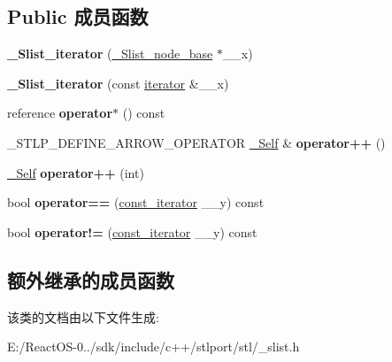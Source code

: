 \subsection*{Public 成员函数}
\begin{DoxyCompactItemize}
\item 
\mbox{\label{class___slist__iterator_a308bd780beccd670b068c846413f3f70}} 
{\bfseries \+\_\+\+Slist\+\_\+iterator} (\hyperlink{struct___slist__node__base}{\+\_\+\+Slist\+\_\+node\+\_\+base} $\ast$\+\_\+\+\_\+x)
\item 
\mbox{\label{class___slist__iterator_a91f6b9c2decc9856cf77cc5e2de3a4b3}} 
{\bfseries \+\_\+\+Slist\+\_\+iterator} (const \hyperlink{class___slist__iterator}{iterator} \&\+\_\+\+\_\+x)
\item 
\mbox{\label{class___slist__iterator_af45228389306e6084902625850643db3}} 
reference {\bfseries operator$\ast$} () const
\item 
\mbox{\label{class___slist__iterator_afdff6869a23700c70431f14831a6d142}} 
\+\_\+\+S\+T\+L\+P\+\_\+\+D\+E\+F\+I\+N\+E\+\_\+\+A\+R\+R\+O\+W\+\_\+\+O\+P\+E\+R\+A\+T\+OR \hyperlink{class___slist__iterator}{\+\_\+\+Self} \& {\bfseries operator++} ()
\item 
\mbox{\label{class___slist__iterator_aaafd73c75ae9f098dc1323a3c7cd0c0a}} 
\hyperlink{class___slist__iterator}{\+\_\+\+Self} {\bfseries operator++} (int)
\item 
\mbox{\label{class___slist__iterator_a46f2812f035bbf7f680793e97707f221}} 
bool {\bfseries operator==} (\hyperlink{class___slist__iterator}{const\+\_\+iterator} \+\_\+\+\_\+y) const
\item 
\mbox{\label{class___slist__iterator_aab2d76d2839c501b195fe27564f54505}} 
bool {\bfseries operator!=} (\hyperlink{class___slist__iterator}{const\+\_\+iterator} \+\_\+\+\_\+y) const
\end{DoxyCompactItemize}
\subsection*{额外继承的成员函数}


该类的文档由以下文件生成\+:\begin{DoxyCompactItemize}
\item 
E\+:/\+React\+O\+S-\/0../sdk/include/c++/stlport/stl/\+\_\+slist.\+h\end{DoxyCompactItemize}
